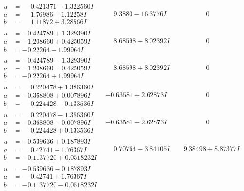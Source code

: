 \documentclass[1p]{elsarticle_modified}
\theoremstyle{definition}
\begin{document}
$$\begin{array}{c|c|c}
\begin{aligned}
u &= \phantom{-}0.421371 - 1.322560 I \\
a &= \phantom{-}1.76986 - 1.12258 I \\
b &= \phantom{-}1.11872 + 3.28566 I\end{aligned}
 & \phantom{-}9.3880 - 16.3776 I & \phantom{-0.000000 } 0 \\ \hline\begin{aligned}
u &= -0.424789 + 1.329390 I \\
a &= -1.208660 + 0.425059 I \\
b &= -0.22264 - 1.99964 I\end{aligned}
 & \phantom{-}8.68598 - 8.02392 I & \phantom{-0.000000 } 0 \\ \hline\begin{aligned}
u &= -0.424789 - 1.329390 I \\
a &= -1.208660 - 0.425059 I \\
b &= -0.22264 + 1.99964 I\end{aligned}
 & \phantom{-}8.68598 + 8.02392 I & \phantom{-0.000000 } 0 \\ \hline\begin{aligned}
u &= \phantom{-}0.220478 + 1.386360 I \\
a &= -0.368808 + 0.007896 I \\
b &= \phantom{-}0.224428 - 0.133536 I\end{aligned}
 & -0.63581 + 2.62873 I & \phantom{-0.000000 } 0 \\ \hline\begin{aligned}
u &= \phantom{-}0.220478 - 1.386360 I \\
a &= -0.368808 - 0.007896 I \\
b &= \phantom{-}0.224428 + 0.133536 I\end{aligned}
 & -0.63581 - 2.62873 I & \phantom{-0.000000 } 0 \\ \hline\begin{aligned}
u &= -0.539636 + 0.187893 I \\
a &= \phantom{-}0.42741 - 1.76367 I \\
b &= -0.1137720 + 0.0518232 I\end{aligned}
 & \phantom{-}0.70764 - 3.84105 I & \phantom{-}9.38498 + 8.87377 I \\ \hline\begin{aligned}
u &= -0.539636 - 0.187893 I \\
a &= \phantom{-}0.42741 + 1.76367 I \\
b &= -0.1137720 - 0.0518232 I\end{aligned}

\end{array}$$
\end{document}
